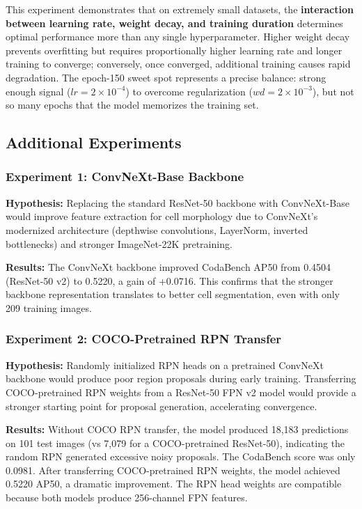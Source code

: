 \documentclass[12pt, a4paper]{article}
\begin{document}
This experiment demonstrates that on extremely small datasets, the \textbf{interaction between learning rate, weight decay, and training duration} determines optimal performance more than any single hyperparameter. Higher weight decay prevents overfitting but requires proportionally higher learning rate and longer training to converge; conversely, once converged, additional training causes rapid degradation. The epoch-150 sweet spot represents a precise balance: strong enough signal ($lr=2\times10^{-4}$) to overcome regularization ($wd=2\times10^{-3}$), but not so many epochs that the model memorizes the training set.

\subsection{Additional Experiments}

\subsubsection{Experiment 1: ConvNeXt-Base Backbone}
\textbf{Hypothesis:} Replacing the standard ResNet-50 backbone with ConvNeXt-Base would improve feature extraction for cell morphology due to ConvNeXt's modernized architecture (depthwise convolutions, LayerNorm, inverted bottlenecks) and stronger ImageNet-22K pretraining.

\textbf{Results:} The ConvNeXt backbone improved CodaBench AP50 from 0.4504 (ResNet-50 v2) to 0.5220, a gain of +0.0716. This confirms that the stronger backbone representation translates to better cell segmentation, even with only 209 training images.

\subsubsection{Experiment 2: COCO-Pretrained RPN Transfer}
\textbf{Hypothesis:} Randomly initialized RPN heads on a pretrained ConvNeXt backbone would produce poor region proposals during early training. Transferring COCO-pretrained RPN weights from a ResNet-50 FPN v2 model would provide a stronger starting point for proposal generation, accelerating convergence.

\textbf{Results:} Without COCO RPN transfer, the model produced 18,183 predictions on 101 test images (vs 7,079 for a COCO-pretrained ResNet-50), indicating the random RPN generated excessive noisy proposals. The CodaBench score was only 0.0981. After transferring COCO-pretrained RPN weights, the model achieved 0.5220 AP50, a dramatic improvement. The RPN head weights are compatible because both models produce 256-channel FPN features.
\end{document}
